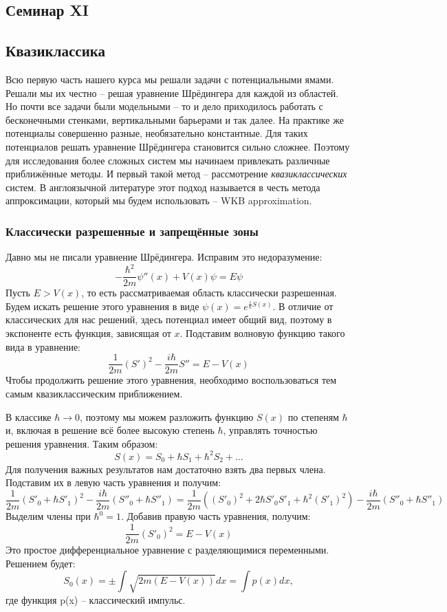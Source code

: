 \begin{center}
    \section{Семинар XI}
\end{center}
\subsection{Квазиклассика}
\hspace{1em} Всю первую часть нашего курса мы решали задачи с потенциальными ямами. Решали мы их честно -- решая уравнение Шрёдингера для каждой из областей. Но почти все задачи были модельными -- то и дело приходилось работать с бесконечными стенками, вертикальными барьерами и так далее. На практике же потенциалы совершенно разные, необязательно константные. Для таких потенциалов решать уравнение Шрёдингера становится сильно сложнее. Поэтому для исследования более сложных систем мы начинаем привлекать различные приближённые методы. И первый такой метод -- рассмотрение \textit{квазиклассических} систем. В англоязычной литературе этот подход называется в честь метода аппроксимации, который мы будем использовать -- WKB approximation.

\subsubsection{Классически разрешенные и запрещённые зоны}
\hspace{1em} Давно мы не писали уравнение Шрёдингера. Исправим это недоразумение:
\[
-\frac{\hbar^2}{2m}\psi''(x) + V(x)\psi = E\psi
\]
Пусть $E > V(x)$, то есть рассматриваемая область классически разрешенная. Будем искать решение этого уравнения в виде $\psi(x) = e^{\frac{i}{\hbar}S(x)}$. В отличие от классических для нас решений, здесь потенциал имеет общий вид, поэтому в экспоненте есть функция, зависящая от $x$. Подставим волновую функцию такого вида в уравнение:
\[
\frac{1}{2m}(S')^2 - \frac{i\hbar}{2m}S'' = E - V(x)
\]
Чтобы продолжить решение этого уравнения, необходимо воспользоваться тем самым квазиклассическим приближением. 

В классике $\hbar \rightarrow 0$, поэтому мы можем разложить функцию $S(x)$ по степеням $\hbar$ и, включая в решение всё более высокую степень $\hbar$, управлять точностью решения уравнения. Таким образом:
\[
S(x) = S_0 + \hbar S_1 + \hbar^2 S_2 + ...
\]
Для получения важных результатов нам достаточно взять два первых члена. Подставим их в левую часть уравнения и получим:
\[
\frac{1}{2m}\left( S'_0 + \hbar S'_1 \right)^2 - \frac{i\hbar}{2m}(S''_0 + \hbar S''_1) = \frac{1}{2m}\left( (S'_0)^2 + 2\hbar S'_0 S'_1 + \hbar^2 (S'_1)^2 \right) - \frac{i\hbar}{2m}(S''_0 + \hbar S''_1)
\]
Выделим члены при $\hbar^0 = 1$. Добавив правую часть уравнения, получим:
\[
\frac{1}{2m}(S'_0)^2 = E - V(x)
\]
Это простое дифференциальное уравнение с разделяющимися переменными. Решением будет:
\[
S_0(x) = \pm \int\sqrt{2m\left( E - V(x) \right)}dx = \int p(x)dx,
\]
где функция p(x) -- классический импульс. 

